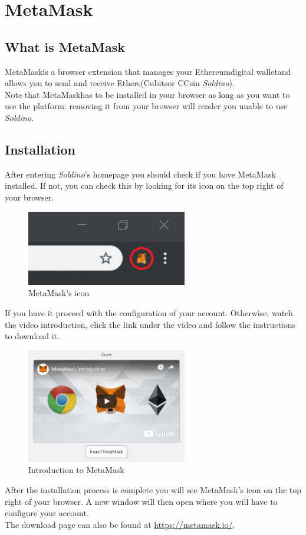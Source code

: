 \section{MetaMask}
	\subsection{What is MetaMask}
	MetaMask\glosp is a browser extension that manages your Ethereum\glosp digital wallet\glosp and 
	allows you to send and receive Ethers\glosp (Cubits\glosp or CCs\glosp in \textit{Soldino}). 
	\\
	Note that MetaMask\glosp has to be installed in your browser as long as you want 
	to use the platform: removing it from your browser will render you unable 
	to use \textit{Soldino}.
	\subsection{Installation}
	After entering \textit{Soldino}'s homepage you should check if you have MetaMask\glosp 
	installed. If not, you can check this by looking for its icon on the top right of your browser.
	\begin{figure}[H]
		\includegraphics[width=7cm]{res/images/metamask_icon.png}
		\centering
		\caption{MetaMask's icon}
	\end{figure}
	\noindent If you have it proceed with the configuration of your account.
	Otherwise, watch the video introduction, click the link under the video and 
	follow the instructions to download it. 
	\begin{figure}[H]
		\includegraphics[width=7cm]{res/images/metamask_download.png}
		\centering
		\caption{Introduction to MetaMask}
	\end{figure}
	\noindent After the installation process is 
	complete you will see MetaMask\glo's icon on the top right of your browser. A 
	new window will then open where you will have to configure your account.\\
	The download page can also be found at \url{https://metamask.io/}.
